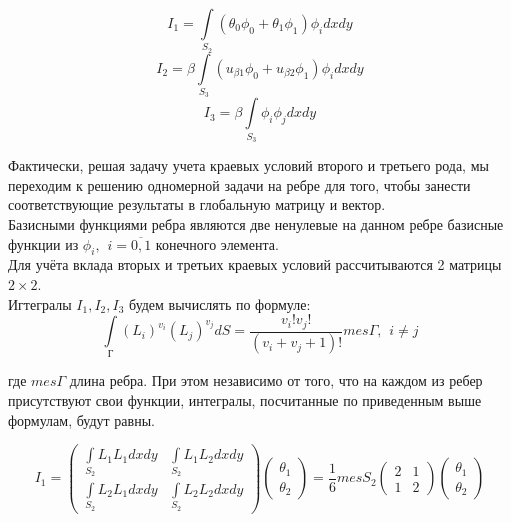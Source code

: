 \documentclass[12pt,a4paper]{article}
\begin{document}
$$ I_1 = \int \limits_{S_2} (\theta_0 \phi_0 + \theta_1 \phi_1) \phi_i dxdy $$
$$ I_2 = \beta \int \limits_{S_3} (u_{\beta 1} \phi_0 + u_{\beta 2} \phi_1) \phi_i dxdy $$
$$ I_3 = \beta \int \limits_{S_3} \phi_i \phi_j dxdy $$

\noindent Фактически, решая задачу учета краевых условий второго
и третьего рода, мы переходим к решению одномерной
задачи на ребре для того, чтобы занести соответствующие
результаты в глобальную матрицу и вектор. \\

\noindent Базисными функциями ребра являются две
ненулевые на данном ребре базисные функции из
$\phi_i, \hspace{5pt} i=\overline{0,1}$
конечного элемента. \\

\noindent Для учёта вклада вторых и третьих краевых условий
рассчитываются 2 матрицы $2 \times 2$. \\

\noindent Игтегралы $I_1, I_2, I_3$ будем вычислять по формуле:
$$
    \int \limits_Г (L_i)^{v_i} (L_j)^{v_j} dS =
    \frac{v_i ! v_j !}{(v_i + v_j + 1)!} mes \varGamma,
    \hspace{5pt} i \neq j
$$

\noindent где $mes \varGamma$ длина ребра. При этом независимо
от того, что на каждом из ребер присутствуют свои функции,
интегралы, посчитанные по приведенным выше формулам,
будут равны.

\renewcommand{\arraystretch}{1.25}
\begin{equation*}
    I_1 =
    \begin{pmatrix}
        \int \limits_{S_2} L_1L_1dxdy & \int \limits_{S_2} L_1L_2dxdy \\
        \int \limits_{S_2} L_2L_1dxdy & \int \limits_{S_2} L_2L_2dxdy
    \end{pmatrix}
    \begin{pmatrix}
        \theta_1 \\
        \theta_2
    \end{pmatrix}
    = \frac{1}{6} mes S_2
    \begin{pmatrix}
        2 & 1 \\
        1 & 2
    \end{pmatrix}
    \begin{pmatrix}
        \theta_1 \\
        \theta_2
    \end{pmatrix}
\end{equation*}
\renewcommand{\arraystretch}{1.0}
\end{document}
